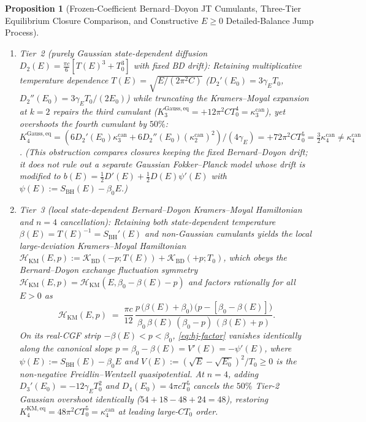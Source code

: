 \documentclass[11pt,a4paper]{article}
\newtheorem{proposition}{Proposition}
\theoremstyle{definition}
\theoremstyle{remark}
\newcommand{\1}{\mathbf{1}}
\begin{document}
\begin{proposition}[Frozen-Coefficient Bernard--Doyon JT Cumulants, Three-Tier Equilibrium Closure Comparison, and Constructive $E\ge 0$ Detailed-Balance Jump Process]
\begin{enumerate}
\begin{enumerate}
    \item[(ii)] \emph{Tier~2 (purely Gaussian state-dependent diffusion $D_2(E)=\frac{\pi c}{6}[T(E)^3+T_0^3]$ with fixed BD drift):} Retaining multiplicative temperature dependence $T(E)=\sqrt{E/(2\pi^2 C)}$ ($D_2'(E_0)=3\gamma_E T_0$, $D_2''(E_0)=3\gamma_E T_0/(2E_0)$) while truncating the Kramers--Moyal expansion at $k=2$ repairs the third cumulant ($K_3^{\mathrm{Gauss,eq}}=+12\pi^2 C T_0^4=\kappa_3^{\mathrm{can}}$), yet \emph{overshoots the fourth cumulant by $50\%$}: $K_4^{\mathrm{Gauss,eq}} = (6 D_2'(E_0)\kappa_3^{\mathrm{can}} + 6 D_2''(E_0)(\kappa_2^{\mathrm{can}})^2)/(4\gamma_E) = +72\pi^2 C T_0^5 = \frac{3}{2}\kappa_4^{\mathrm{can}} \neq \kappa_4^{\mathrm{can}}$. (This obstruction compares closures keeping the fixed Bernard--Doyon drift; it does not rule out a separate Gaussian Fokker--Planck model whose drift is modified to $b(E)=\frac{1}{2}D'(E)+\frac{1}{2}D(E)\psi'(E)$ with $\psi(E):=S_{\mathrm{BH}}(E)-\beta_0 E$.)
    \item[(iii)] \emph{Tier~3 (local state-dependent Bernard--Doyon Kramers--Moyal Hamiltonian and $n=4$ cancellation):} Retaining both state-dependent temperature $\beta(E)=T(E)^{-1}=S_{\mathrm{BH}}'(E)$ and non-Gaussian cumulants yields the local large-deviation Kramers--Moyal Hamiltonian $\mathcal{H}_{\mathrm{KM}}(E,p) := \mathcal{K}_{\mathrm{BD}}(-p; T(E)) + \mathcal{K}_{\mathrm{BD}}(+p; T_0)$, which obeys the Bernard--Doyon exchange fluctuation symmetry $\mathcal{H}_{\mathrm{KM}}(E,p)=\mathcal{H}_{\mathrm{KM}}(E,\beta_0-\beta(E)-p)$ \cite{BernardDoyon2012,BernardDoyon2015} and \emph{factors rationally} for all $E>0$ as
    \begin{equation}\label{eq:hj-factor}
      \mathcal{H}_{\mathrm{KM}}(E,p)
      \;=\; \frac{\pi c}{12}\,\frac{p\,\bigl(\beta(E)+\beta_0\bigr)\,\bigl(p - [\beta_0 - \beta(E)]\bigr)}{\beta_0\,\beta(E)\,(\beta_0 - p)\,(\beta(E) + p)}.
    \end{equation}
    On its real-CGF strip $-\beta(E) < p < \beta_0$, \eqref{eq:hj-factor} vanishes identically along the canonical slope $p = \beta_0 - \beta(E) = V'(E) = -\psi'(E)$, where $\psi(E) := S_{\mathrm{BH}}(E)-\beta_0 E$ and $V(E) := (\sqrt{E}-\sqrt{E_0})^2/T_0 \ge 0$ is the non-negative Freidlin--Wentzell quasipotential. At $n=4$, adding $D_3'(E_0)=-12\gamma_E T_0^2$ and $D_4(E_0)=4\pi c T_0^5$ cancels the $50\%$ Tier-2 Gaussian overshoot identically ($54+18-48+24 = 48$), restoring $K_4^{\mathrm{KM,eq}} = 48\pi^2 C T_0^5 = \kappa_4^{\mathrm{can}}$ at leading large-$CT_0$ order.
  \end{enumerate}

\end{enumerate}
\end{proposition}
\end{document}
